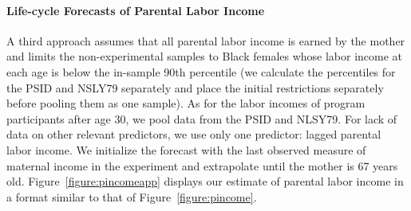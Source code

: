 \paragraph{Life-cycle Forecasts of Parental Labor Income} \label{appendix:lcyclepincome}

\noindent A third approach assumes that all parental labor income is earned by the mother and limits the non-experimental samples to Black females whose labor income at each age is below the in-sample 90th percentile (we calculate the percentiles for the PSID and NSLY79 separately and place the initial restrictions separately before pooling them as one sample). As for the labor incomes of program participants after age 30, we pool data from the PSID and NLSY79. For lack of data on other relevant predictors, we use only one predictor: lagged parental labor income. We initialize the forecast with the last observed measure of maternal income in the experiment and extrapolate until the mother is 67 years old. Figure~\ref{figure:pincomeapp} displays our estimate of parental labor income in a format similar to that of Figure~\ref{figure:pincome}.


